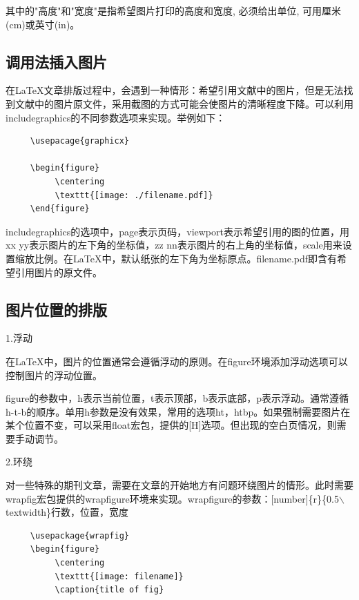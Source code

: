 \documentclass[12pt]{book}
\begin{document}
其中的"高度"和"宽度"是指希望图片打印的高度和宽度, 必须给出单位, 可用厘米(cm)或英寸(in)。

\subsection{调用法插入图片}


在\LaTeX{}文章排版过程中，会遇到一种情形：希望引用文献中的图片，但是无法找到文献中的图片原文件，采用截图的方式可能会使图片的清晰程度下降。可以利用includegraphics的不同参数选项来实现。举例如下：
\begin{verbatim}
     \usepacage{graphicx}
     
     \begin{figure}
          \centering
          \texttt{[image: ./filename.pdf]}
     \end{figure}
\end{verbatim}

includegraphics的选项中，page表示页码，viewport表示希望引用的图的位置，用xx yy表示图片的左下角的坐标值，zz nn表示图片的右上角的坐标值，scale用来设置缩放比例。在\LaTeX{}中，默认纸张的左下角为坐标原点。filename.pdf即含有希望引用图片的原文件。

\subsection{图片位置的排版}


1.浮动

在\LaTeX{}中，图片的位置通常会遵循浮动的原则。在figure环境添加浮动选项可以控制图片的浮动位置。

figure的参数中，h表示当前位置，t表示顶部，b表示底部，p表示浮动。通常遵循h-t-b的顺序。单用h参数是没有效果，常用的选项ht，htbp。如果强制需要图片在某个位置不变，可以采用float宏包，提供的[H]选项。但出现的空白页情况，则需要手动调节。

2.环绕

对一些特殊的期刊文章，需要在文章的开始地方有问题环绕图片的情形。此时需要wrapfig宏包提供的wrapfigure环境来实现。wrapfigure的参数：[number]\{r\}\{0.5$\backslash$textwidth\}行数，位置，宽度

\begin{verbatim}
     \usepackage{wrapfig}
     \begin{figure}
          \centering
          \texttt{[image: filename]}
          \caption{title of fig}
\end{verbatim}
\end{document}
